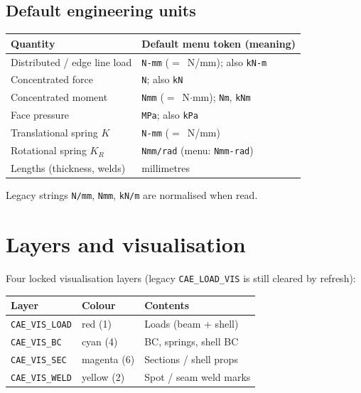 \documentclass[a4paper]{ltxdoc}
\begin{document}
\subsection{Default engineering units}
\begin{center}
\begin{tabular}{@{}ll@{}}
\toprule
Quantity & Default menu token (meaning) \\
\midrule
Distributed / edge line load & \texttt{N-mm} ($=$~N/mm); also \texttt{kN-m} \\
Concentrated force           & \texttt{N}; also \texttt{kN} \\
Concentrated moment          & \texttt{Nmm} ($=$~N$\cdot$mm); \texttt{Nm}, \texttt{kNm} \\
Face pressure                & \texttt{MPa}; also \texttt{kPa} \\
Translational spring $K$     & \texttt{N-mm} ($=$~N/mm) \\
Rotational spring $K_R$      & \texttt{Nmm/rad} (menu: \texttt{Nmm-rad}) \\
Lengths (thickness, welds)   & millimetres \\
\bottomrule
\end{tabular}
\end{center}
Legacy strings \texttt{N/mm}, \texttt{Nmm}, \texttt{kN/m} are normalised when
read.

\section{Layers and visualisation}

Four locked visualisation layers (legacy \texttt{CAE\_LOAD\_VIS} is still
cleared by refresh):

\begin{center}
\begin{tabular}{@{}lll@{}}
\toprule
Layer & Colour & Contents \\
\midrule
\texttt{CAE\_VIS\_LOAD} & red (1)     & Loads (beam + shell) \\
\texttt{CAE\_VIS\_BC}   & cyan (4)    & BC, springs, shell BC \\
\texttt{CAE\_VIS\_SEC}  & magenta (6) & Sections / shell props \\
\texttt{CAE\_VIS\_WELD} & yellow (2)  & Spot / seam weld marks \\
\bottomrule
\end{tabular}
\end{center}
\end{document}

